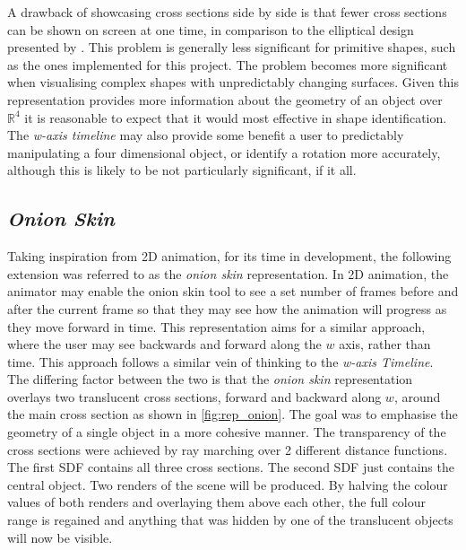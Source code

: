 \documentclass{l4proj}
\begin{document}
A drawback of showcasing cross sections side by side is that fewer cross sections can be shown on screen at one time, in comparison to the elliptical design presented by \citet{kageyama_visualization_2015}. This problem is generally less significant for primitive shapes, such as the ones implemented for this project. The problem becomes more significant when visualising complex shapes with unpredictably changing surfaces.
Given this representation provides more information about the geometry of an object over $\mathbb{R}^4$ it is reasonable to expect that it would most effective in shape identification. The \textit{w-axis timeline} may also provide some benefit a user to predictably manipulating a four dimensional object, or identify a rotation more accurately, although this is likely to be not particularly significant, if it all.

\subsection{\textit{Onion Skin}}
Taking inspiration from 2D animation, for its time in development, the following extension was referred to as the \textit{onion skin} representation. In 2D animation, the animator may enable the onion skin tool to see a set number of frames before and after the current frame so that they may see how the animation will progress as they move forward in time. 
This representation aims for a similar approach, where the user may see backwards and forward along the \(w\) axis, rather than time. This approach follows a similar vein of thinking to the \textit{w-axis Timeline}. 
The differing factor between the two is that the \textit{onion skin} representation overlays two translucent cross sections, forward and backward along \(w\), around the main cross section as shown in 
\cref{fig:rep_onion}. The goal was to emphasise the geometry of a single object in a more cohesive manner.
The transparency of the cross sections were achieved by ray marching over 2 different distance functions. The first SDF contains all three cross sections. The second SDF just contains the central object. Two renders of the scene will be produced. By halving the colour values of both renders and overlaying them above each other, the full colour range is regained and anything that was hidden by one of the translucent objects will now be visible.
\end{document}

